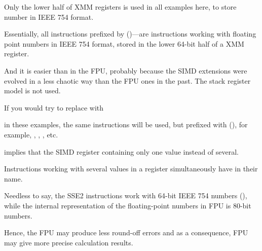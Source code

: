 Only the lower half of XMM registers is used in all examples here, 
to store number in IEEE 754 format.

Essentially, all instructions prefixed by 
 ()---are instructions working with floating point numbers
in IEEE 754 format, stored in the lower 64-bit half of a XMM register.

And it is easier than in the FPU, probably because the SIMD extensions 
were evolved in a less chaotic way than the FPU ones in the past.
The stack register model is not used.

If you would try to replace \Tdouble with \Tfloat

in these examples, the same instructions will be used, but prefixed with  
(), for example, , , , etc.

implies that the SIMD register containing only one value instead of several.

Instructions working with several values in a register simultaneously have  in their name.

Needless to say, the SSE2 instructions work with 64-bit IEEE 754 numbers (\Tdouble),
while the internal representation of the floating-point numbers in FPU is 80-bit numbers.

Hence, the FPU may produce less round-off errors and as a consequence, FPU may give more precise
calculation results.
